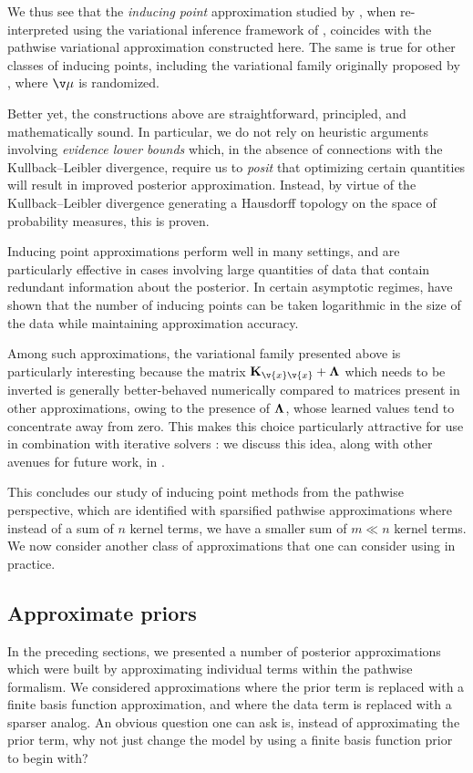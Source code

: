 \documentclass[11pt]{book}
\begin{document}
We thus see that the \emph{inducing point} approximation studied by \textcite{opper09}, when re-interpreted using the variational inference framework of \textcite{titsias09}, coincides with the pathwise variational approximation constructed here.
The same is true for other classes of inducing points, including the variational family originally proposed by \textcite{titsias09}, where $\v\mu$ is randomized.

Better yet, the constructions above are straightforward, principled, and mathematically sound.
In particular, we do not rely on heuristic arguments involving \emph{evidence lower bounds} which, in the absence of connections with the Kullback--Leibler divergence, require us to \emph{posit} that optimizing certain quantities will result in improved posterior approximation.
Instead, by virtue of the Kullback--Leibler divergence generating a Hausdorff topology on the space of probability measures, this is proven.

Inducing point approximations perform well in many settings, and are particularly effective in cases involving large quantities of data that contain redundant information about the posterior.
In certain asymptotic regimes, \textcite{burt19} have shown that the number of inducing points can be taken logarithmic in the size of the data while maintaining approximation accuracy.

Among such approximations, the variational family presented above is particularly interesting because the matrix $\m{K}_{\v{x}\v{x}} + \m\Lambda$ which needs to be inverted is generally better-behaved numerically compared to matrices present in other approximations, owing to the presence of $\m\Lambda$, whose learned values tend to concentrate away from zero.
This makes this choice particularly attractive for use in combination with iterative solvers \cite{dong17,gardner18,pleiss18,meanti20,pleiss20}: we discuss this idea, along with other avenues for future work, in .

This concludes our study of inducing point methods from the pathwise perspective, which are identified with sparsified pathwise approximations where instead of a sum of $n$ kernel terms, we have a smaller sum of $m \ll n$ kernel terms.
We now consider another class of approximations that one can consider using in practice.

\subsection{Approximate priors}
In the preceding sections, we presented a number of posterior approximations which were built by approximating individual terms within the pathwise formalism.
We considered approximations where the prior term is replaced with a finite basis function approximation, and where the data term is replaced with a sparser analog.
An obvious question one can ask is, instead of approximating the prior term, why not just change the model by using a finite basis function prior to begin with?
\end{document}

